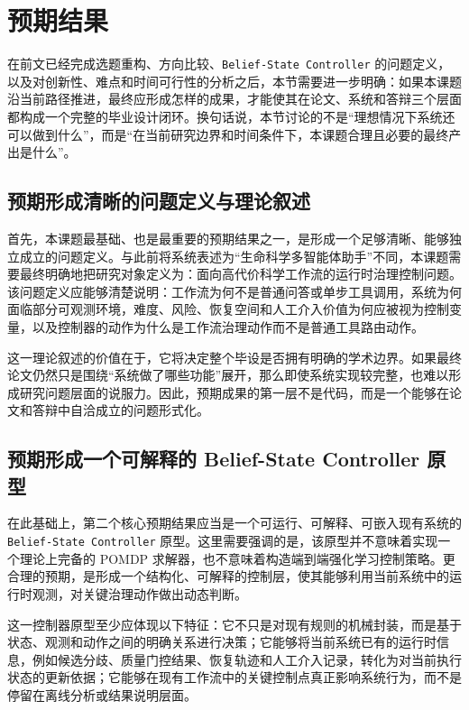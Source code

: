 \section{预期结果}

在前文已经完成选题重构、方向比较、\texttt{Belief-State Controller} 的问题定义，以及对创新性、难点和时间可行性的分析之后，本节需要进一步明确：如果本课题沿当前路径推进，最终应形成怎样的成果，才能使其在论文、系统和答辩三个层面都构成一个完整的毕业设计闭环。换句话说，本节讨论的不是“理想情况下系统还可以做到什么”，而是“在当前研究边界和时间条件下，本课题合理且必要的最终产出是什么”。

\subsection{预期形成清晰的问题定义与理论叙述}

首先，本课题最基础、也是最重要的预期结果之一，是形成一个足够清晰、能够独立成立的问题定义。与此前将系统表述为“生命科学多智能体助手”不同，本课题需要最终明确地把研究对象定义为：面向高代价科学工作流的运行时治理控制问题。该问题定义应能够清楚说明：工作流为何不是普通问答或单步工具调用，系统为何面临部分可观测环境，难度、风险、恢复空间和人工介入价值为何应被视为控制变量，以及控制器的动作为什么是工作流治理动作而不是普通工具路由动作。

这一理论叙述的价值在于，它将决定整个毕设是否拥有明确的学术边界。如果最终论文仍然只是围绕“系统做了哪些功能”展开，那么即使系统实现较完整，也难以形成研究问题层面的说服力。因此，预期成果的第一层不是代码，而是一个能够在论文和答辩中自洽成立的问题形式化。

\subsection{预期形成一个可解释的 Belief-State Controller 原型}

在此基础上，第二个核心预期结果应当是一个可运行、可解释、可嵌入现有系统的 \texttt{Belief-State Controller} 原型。这里需要强调的是，该原型并不意味着实现一个理论上完备的 POMDP 求解器，也不意味着构造端到端强化学习控制策略。更合理的预期，是形成一个结构化、可解释的控制层，使其能够利用当前系统中的运行时观测，对关键治理动作做出动态判断。

这一控制器原型至少应体现以下特征：它不只是对现有规则的机械封装，而是基于状态、观测和动作之间的明确关系进行决策；它能够将当前系统已有的运行时信息，例如候选分歧、质量门控结果、恢复轨迹和人工介入记录，转化为对当前执行状态的更新依据；它能够在现有工作流中的关键控制点真正影响系统行为，而不是停留在离线分析或结果说明层面。

